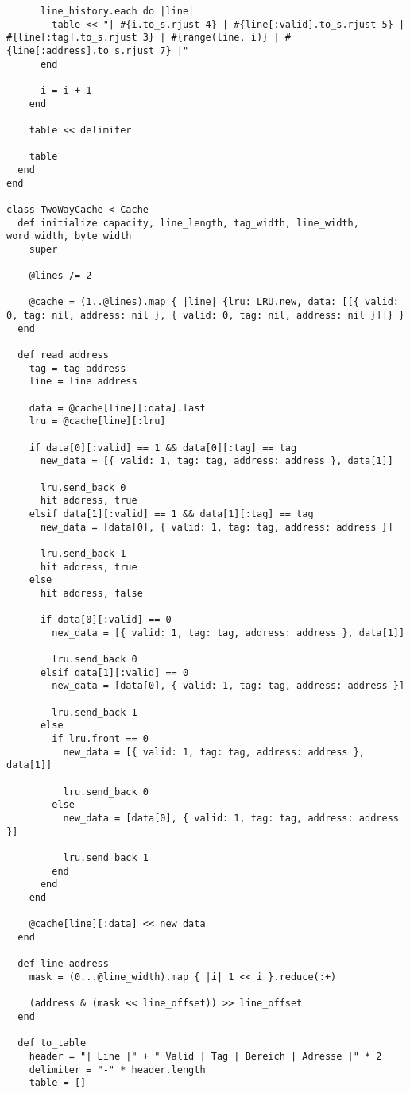 \documentclass[10pt,a4paper]{article}
\begin{document}
\begin{lstlisting}
      line_history.each do |line|
        table << "| #{i.to_s.rjust 4} | #{line[:valid].to_s.rjust 5} | #{line[:tag].to_s.rjust 3} | #{range(line, i)} | #{line[:address].to_s.rjust 7} |"
      end

      i = i + 1
    end

    table << delimiter

    table
  end
end

class TwoWayCache < Cache
  def initialize capacity, line_length, tag_width, line_width, word_width, byte_width
    super

    @lines /= 2

    @cache = (1..@lines).map { |line| {lru: LRU.new, data: [[{ valid: 0, tag: nil, address: nil }, { valid: 0, tag: nil, address: nil }]]} }
  end

  def read address
    tag = tag address
    line = line address

    data = @cache[line][:data].last
    lru = @cache[line][:lru]

    if data[0][:valid] == 1 && data[0][:tag] == tag
      new_data = [{ valid: 1, tag: tag, address: address }, data[1]]

      lru.send_back 0
      hit address, true
    elsif data[1][:valid] == 1 && data[1][:tag] == tag
      new_data = [data[0], { valid: 1, tag: tag, address: address }]

      lru.send_back 1
      hit address, true
    else
      hit address, false

      if data[0][:valid] == 0
        new_data = [{ valid: 1, tag: tag, address: address }, data[1]]

        lru.send_back 0
      elsif data[1][:valid] == 0
        new_data = [data[0], { valid: 1, tag: tag, address: address }]

        lru.send_back 1
      else
        if lru.front == 0
          new_data = [{ valid: 1, tag: tag, address: address }, data[1]]

          lru.send_back 0
        else
          new_data = [data[0], { valid: 1, tag: tag, address: address }]

          lru.send_back 1
        end
      end
    end

    @cache[line][:data] << new_data
  end

  def line address
    mask = (0...@line_width).map { |i| 1 << i }.reduce(:+)

    (address & (mask << line_offset)) >> line_offset
  end

  def to_table
    header = "| Line |" + " Valid | Tag | Bereich | Adresse |" * 2
    delimiter = "-" * header.length
    table = []


\end{lstlisting}
\end{document}
